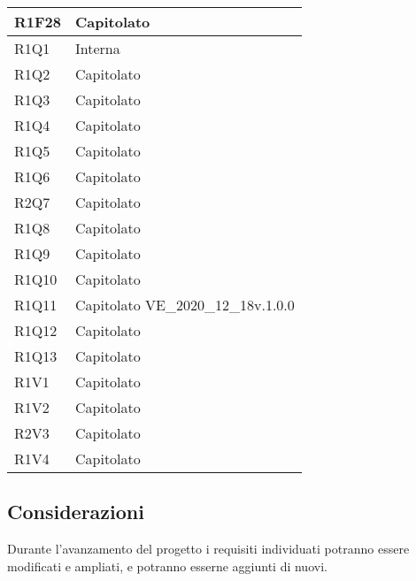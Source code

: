 \begin{center}
\begin{longtable}{|p{22mm}|p{44mm}|}
R1F28 &
Capitolato \newline
\\
\hline

R1Q1 &
Interna \newline
\\
\hline

R1Q2 &
Capitolato \newline
\\
\hline

R1Q3 &
Capitolato \newline
\\
\hline

R1Q4 &
Capitolato \newline
\\
\hline

R1Q5 &
Capitolato \newline
\\
\hline

R1Q6 &
Capitolato \newline
\\
\hline

R2Q7 &
Capitolato \newline
\\
\hline

R1Q8 &
Capitolato \newline
\\
\hline

R1Q9 &
Capitolato \newline
\\
\hline

R1Q10 &
Capitolato \newline
\\
\hline

R1Q11 &
Capitolato \newline
VE\_2020\_12\_18v.1.0.0 \newline
\\
\hline

R1Q12 &
Capitolato \newline
\\
\hline

R1Q13 &
Capitolato \newline
\\
\hline

R1V1 &
Capitolato \newline
\\
\hline

R1V2 &
Capitolato \newline
\\
\hline

R2V3 &
Capitolato \newline
\\
\hline

R1V4 &
Capitolato \newline
\\
\hline
	
	\end{longtable}
\end{center}

\subsection{Considerazioni}
Durante l'avanzamento del progetto i requisiti individuati potranno essere modificati e ampliati, e potranno esserne aggiunti di nuovi.